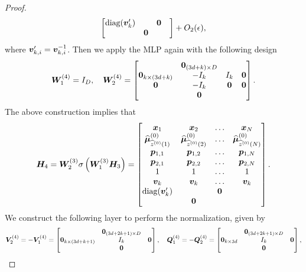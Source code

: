 \begin{proof}
\begin{align*}
\begin{bmatrix}
        \text{diag}(\boldsymbol{v}_k^\prime)&&\boldsymbol{0}&\\
        &\boldsymbol{0}&&
    \end{bmatrix}+O_{2}(\epsilon),
\end{align*}
where $\boldsymbol{v}_{k,i}^\prime = \boldsymbol{v}_{k,i}^{-1}$. Then we apply the MLP again with the following design 
\begin{align*}
    \boldsymbol{W}_1^{(4)}= I_D,\quad\boldsymbol{W}_2^{(4)}=\begin{bmatrix}
        &\boldsymbol{0}_{(3d+k)\times D}&&\\
        \boldsymbol{0}_{k\times(3d+k)}&-I_k&I_k&\boldsymbol{0}\\
        \boldsymbol{0}&-I_k&\boldsymbol{0}&\boldsymbol{0}\\
        &\boldsymbol{0}&&
    \end{bmatrix}.
\end{align*}
The above construction implies that
\begin{align*}
    \boldsymbol{H}_4 =\boldsymbol{W}_2^{(3)}\sigma\left(\boldsymbol{W}_1^{(3)}\boldsymbol{H}_3\right) = \begin{bmatrix}
        \boldsymbol{x}_1&\boldsymbol{x}_2&\ldots&\boldsymbol{x}_N\\
        \widehat{\boldsymbol{\mu}}_{\widehat{z}^{(0)}(1)}^{(0)}&\widehat{\boldsymbol{\mu}}_{\widehat{z}^{(0)}(2)}^{(0)}&\ldots&\widehat{\boldsymbol{\mu}}_{\widehat{z}^{(0)}(N)}^{(0)}\\
        \boldsymbol{p}_{1,1}&\boldsymbol{p}_{1,2}&\ldots&\boldsymbol{p}_{1,N}\\
        \boldsymbol{p}_{2,1}&\boldsymbol{p}_{2,2}&\ldots&\boldsymbol{p}_{2,N}\\
        1&1&\ldots&1\\
        \boldsymbol{v}_k&\boldsymbol{v}_k&\ldots&\boldsymbol{v}_k\\
        \text{diag}(\boldsymbol{v}_k^\prime)&&\boldsymbol{0}&\\
        &\boldsymbol{0}&&
    \end{bmatrix}.
\end{align*}
We construct the following layer to perform the normalization, given by 
\begin{align*}
    \bfa V_2^{(4)}&=-\bfa V_{1}^{(4)}= \begin{bmatrix}
    &\bfa 0_{(3d+2k+1)\times D}& \\
    \bfa 0_{k\times(3d+k+1)}&I_{k}&\bfa 0\\
    &\bfa 0&
    \end{bmatrix},\quad \bfa Q_1^{(4)} =-\bfa Q_2^{(4)}= \begin{bmatrix}
        &\bfa 0_{(3d+2k+1)\times D}&\\
        \bfa 0_{k\times 3d}&I_{k}&\bfa 0\\
        &\bfa 0&
    \end{bmatrix},\\

\end{align*}
\end{proof}
